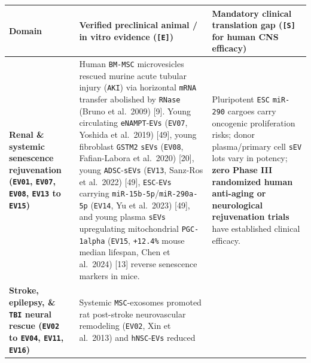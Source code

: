 \documentclass[10pt,letterpaper]{article}
\begin{document}
{\footnotesize\setlength{\tabcolsep}{3.8pt}\renewcommand{\arraystretch}{1.15}
\begin{longtable}[]{@{}
  >{\raggedright\arraybackslash}p{}
  >{\raggedright\arraybackslash}p{}
  >{\raggedright\arraybackslash}p{}@{}}
\toprule\noalign{}
\begin{minipage}[b]{\linewidth}\raggedright
\textbf{Domain}
\end{minipage} & \begin{minipage}[b]{\linewidth}\raggedright
\textbf{Verified preclinical animal / in vitro evidence
(\texttt{{[}E{]}})}
\end{minipage} & \begin{minipage}[b]{\linewidth}\raggedright
\textbf{Mandatory clinical translation gap (\texttt{{[}S{]}} for human
CNS efficacy)}
\end{minipage} \\
\midrule\noalign{}
\endhead
\bottomrule\noalign{}
\endlastfoot
\textbf{Renal \& systemic senescence rejuvenation (\texttt{EV01},
\texttt{EV07}, \texttt{EV08}, \texttt{EV13} to \texttt{EV15})} & Human
\texttt{BM-MSC} microvesicles rescued murine acute tubular injury
(\texttt{AKI}) via horizontal \texttt{mRNA} transfer abolished by
\texttt{RNase} (Bruno et al.~2009) {[}9{]}. Young circulating
\texttt{eNAMPT}-\texttt{EVs} (\texttt{EV07}, Yoshida et al.~2019)
{[}49{]}, young fibroblast \texttt{GSTM2} \texttt{sEVs} (\texttt{EV08},
Fafian-Labora et al.~2020) {[}20{]}, young \texttt{ADSC}-\texttt{sEVs}
(\texttt{EV13}, Sanz-Ros et al.~2022) {[}49{]},
\texttt{ESC}-\texttt{EVs} carrying
\texttt{miR-\allowbreak{}15b-\allowbreak{}5p}/\texttt{miR-\allowbreak{}290a-\allowbreak{}5p} (\texttt{EV14}, Yu et al.~2023)
{[}49{]}, and young plasma \texttt{sEVs} upregulating mitochondrial
\texttt{PGC-\allowbreak{}1alpha} (\texttt{EV15}, \texttt{+12.4\%} mouse median
lifespan, Chen et al.~2024) {[}13{]} reverse senescence markers in mice.
& Pluripotent \texttt{ESC} \texttt{miR-290} cargoes carry oncogenic
proliferation risks; donor plasma/primary cell \texttt{sEV} lots vary in
potency; \textbf{zero Phase III randomized human anti-aging or
neurological rejuvenation trials} have established clinical efficacy. \\
\textbf{Stroke, epilepsy, \& \texttt{TBI} neural rescue (\texttt{EV02}
to \texttt{EV04}, \texttt{EV11}, \texttt{EV16})} & Systemic
\texttt{MSC}-exosomes promoted rat post-stroke neurovascular remodeling
(\texttt{EV02}, Xin et al.~2013) and \texttt{hNSC}-\texttt{EVs} reduced

\end{longtable}}
\end{document}
